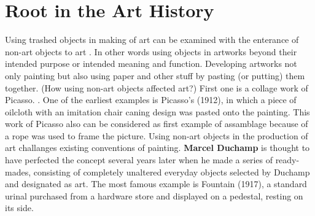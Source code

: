 \section{Root in the Art History}
Using trashed objects in making of art can be examined with the enterance of non-art objects to art . In other words using objects in artworks beyond their intended purpose or intended meaning and function. Developing artworks not only painting but also using paper and other stuff by pasting (or putting) them together. (How using non-art objects affected art?)  First one is a collage work of Picasso.  . One of the earliest examples is Picasso’s  (1912), in which a piece of oilcloth with an imitation chair caning design was pasted onto the painting. This work of Picasso also can be considered as first example of assamblage because of a rope was used to frame the picture. Using non-art objects in the production of art challanges existing conventions of painting. 
  \textbf{Marcel Duchamp} is thought to have perfected the concept several years later when he made a series of ready-mades, consisting of completely unaltered everyday objects selected by Duchamp and designated as art. The most famous example is Fountain (1917), a standard urinal purchased from a hardware store and displayed on a pedestal, resting on its side.

